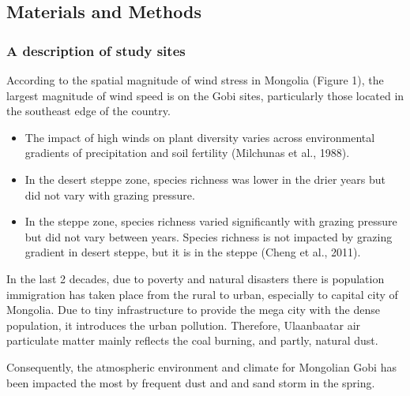 \documentclass[
  11pt,
]{article}
\providecommand{\tightlist}{%
  \setlength{\itemsep}{0pt}\setlength{\parskip}{0pt}}
\begin{document}
\newpage

\subsection{Materials and Methods}\label{materials-and-methods}

\subsubsection{A description of study
sites}\label{a-description-of-study-sites}

According to the spatial magnitude of wind stress in Mongolia (Figure
1), the largest magnitude of wind speed is on the Gobi sites,
particularly those located in the southeast edge of the country.

\begin{itemize}
\tightlist
\item
  The impact of high winds on plant diversity varies across
  environmental gradients of precipitation and soil fertility (Milchunas
  et al., 1988).
\item
  In the desert steppe zone, species richness was lower in the drier
  years but did not vary with grazing pressure.
\item
  In the steppe zone, species richness varied significantly with grazing
  pressure but did not vary between years. Species richness is not
  impacted by grazing gradient in desert steppe, but it is in the steppe
  (Cheng et al., 2011).
\end{itemize}

In the last 2 decades, due to poverty and natural disasters there is
population immigration has taken place from the rural to urban,
especially to capital city of Mongolia. Due to tiny infrastructure to
provide the mega city with the dense population, it introduces the urban
pollution. Therefore, Ulaanbaatar air particulate matter mainly reflects
the coal burning, and partly, natural dust.

Consequently, the atmospheric environment and climate for Mongolian Gobi
has been impacted the most by frequent dust and and sand storm in the
spring.
\end{document}

